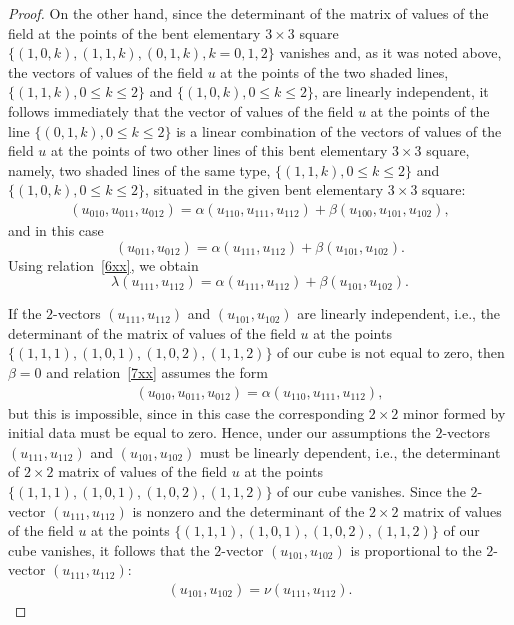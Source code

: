 \begin{proof}
On the other hand, since the determinant of the matrix of values of
the f\/ield at the points of the bent elementary $3 \times 3$ square
$\{(1, 0, k), (1, 1, k), (0, 1, k), k = 0, 1, 2\}$ vanishes and, as
it was noted above, the vectors of values of the f\/ield $u$ at the
points of the two shaded lines, $\{(1, 1, k), 0 \leq k \leq 2\}$ and
$\{(1, 0, k), 0 \leq k \leq 2\}$, are linearly independent, it
follows immediately that the vector of values of the f\/ield $u$ at
the points of the line $\{(0, 1, k), 0 \leq k \leq 2\}$ is a linear
combination of the vectors of values of the f\/ield $u$ at the points
of two other lines of this bent elementary $3 \times 3$ square,
namely, two shaded lines of the same type, $\{(1, 1, k), 0 \leq k
\leq 2\}$ and $\{(1, 0, k), 0 \leq k \leq 2\}$, situated in the
given bent elementary $3 \times 3$ square:
\begin{gather} (u_{0 1 0}, u_{0 1 1}, u_{0 1 2}) = \alpha (u_{1 1 0}, u_{1 1
1}, u_{1 1 2}) + \beta (u_{1 0 0}, u_{1 0 1}, u_{1 0 2}),
\label{7xx}
\end{gather}
and in this case \[ (u_{0 1 1}, u_{0 1 2}) = \alpha
(u_{1 1 1}, u_{1 1 2}) + \beta (u_{1 0 1}, u_{1 0 2}). \] Using
relation~\eqref{6xx}, we obtain \[ \lambda (u_{1 1 1}, u_{1 1 2}) =
\alpha (u_{1 1 1}, u_{1 1 2}) + \beta (u_{1 0 1}, u_{1 0 2}). \]


If the $2$-vectors $(u_{1 1 1}, u_{1 1 2})$ and $(u_{1 0 1}, u_{1 0
2})$ are linearly independent, i.e., the determinant of the matrix
of values of the f\/ield $u$ at the points $\{(1, 1, 1), (1, 0, 1),
(1, 0, 2), (1, 1, 2)\}$ of our cube is not equal to zero, then
$\beta = 0$ and relation~\eqref{7xx} assumes the form
\begin{gather*}
(u_{0 1 0}, u_{0 1 1}, u_{0 1 2}) = \alpha (u_{1 1 0}, u_{1 1 1}, u_{1 1
2}), %
\end{gather*}
but this is impossible, since in this case the
corresponding $2 \times 2$ minor formed by initial data must be
equal to zero.
Hence, under our assumptions the $2$-vectors $(u_{1 1 1}, u_{1 1
2})$ and $(u_{1 0 1}, u_{1 0 2})$ must be linearly dependent, i.e.,
the determinant of $2 \times 2$ matrix of values of the f\/ield $u$ at
the points $\{(1, 1, 1), (1, 0, 1), (1, 0, 2), (1, 1, 2)\}$ of our
cube vanishes. Since the $2$-vector $(u_{1 1 1}, u_{1 1 2})$ is
nonzero and the determinant of the $2 \times 2$ matrix of values of
the f\/ield $u$ at the points $\{(1, 1, 1), (1, 0, 1), (1, 0, 2), (1,
1, 2)\}$ of our cube vanishes, it follows that the $2$-vector $(u_{1
0 1}, u_{1 0 2})$ is proportional to the $2$-vector $(u_{1 1 1},
u_{1 1 2})$: \begin{gather} (u_{1 0 1}, u_{1 0 2}) = \nu (u_{1 1 1}, u_{1 1
2}). \label{9xx}
\end{gather}



\end{proof}
